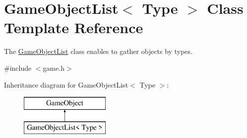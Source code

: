 \hypertarget{class_game_object_list}{\section{\-Game\-Object\-List$<$ \-Type $>$ \-Class \-Template \-Reference}
\label{class_game_object_list}
}


\-The \hyperlink{class_game_object_list}{\-Game\-Object\-List} class enables to gather objects by types.  




{\ttfamily \#include $<$game.\-h$>$}

\-Inheritance diagram for \-Game\-Object\-List$<$ \-Type $>$\-:\begin{figure}[H]
\begin{center}
\leavevmode
\includegraphics[height=2.000000cm]{class_game_object_list}
\end{center}
\end{figure}
